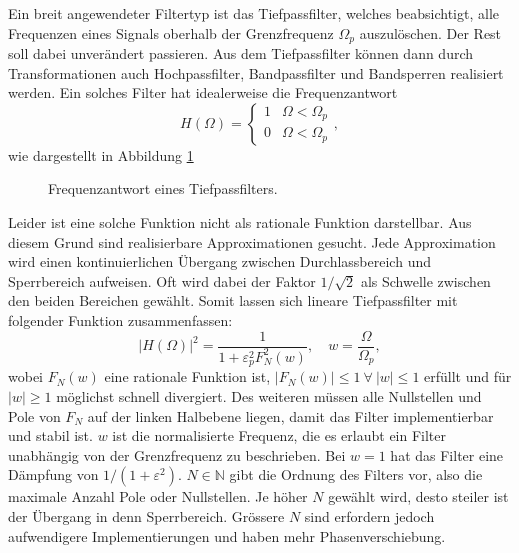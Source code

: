 Ein breit angewendeter Filtertyp ist das Tiefpassfilter, welches beabsichtigt, alle Frequenzen eines Signals oberhalb der Grenzfrequenz $\Omega_p$ auszulöschen.
Der Rest soll dabei unverändert passieren.
Aus dem Tiefpassfilter können dann durch Transformationen auch Hochpassfilter, Bandpassfilter und Bandsperren realisiert werden.
Ein solches Filter hat idealerweise die Frequenzantwort
\begin{equation}
    H(\Omega) =
    \begin{cases}
        1  & \Omega < \Omega_p \\
        0  & \Omega < \Omega_p
    \end{cases},
\end{equation}
wie dargestellt in Abbildung \ref{ellfilter:fig:lp}
\begin{figure}
    \centering
    
    \caption{Frequenzantwort eines Tiefpassfilters.}
    \label{ellfilter:fig:lp}
\end{figure}
Leider ist eine solche Funktion nicht als rationale Funktion darstellbar.
Aus diesem Grund sind realisierbare Approximationen gesucht.
Jede Approximation wird einen kontinuierlichen Übergang zwischen Durchlassbereich und Sperrbereich aufweisen.
Oft wird dabei der Faktor $1/\sqrt{2}$ als Schwelle zwischen den beiden Bereichen gewählt.
Somit lassen sich lineare Tiefpassfilter mit folgender Funktion zusammenfassen:
\begin{equation}
    | H(\Omega)|^2 = \frac{1}{1 + \varepsilon_p^2 F_N^2(w)}, \quad w=\frac{\Omega}{\Omega_p},
\end{equation}
wobei $F_N(w)$ eine rationale Funktion ist, $|F_N(w)| \leq 1 ~\forall~ |w| \leq 1$ erfüllt und für $|w| \geq 1$ möglichst schnell divergiert.
Des weiteren müssen alle Nullstellen und Pole von $F_N$ auf der linken Halbebene liegen, damit das Filter implementierbar und stabil ist.
$w$ ist die normalisierte Frequenz, die es erlaubt ein Filter unabhängig von der Grenzfrequenz zu beschrieben.
Bei $w=1$ hat das Filter eine Dämpfung von $1/(1+\varepsilon^2)$.
$N \in \mathbb{N} $ gibt die Ordnung des Filters vor, also die maximale Anzahl Pole oder Nullstellen.
Je höher $N$ gewählt wird, desto steiler ist der Übergang in denn Sperrbereich.
Grössere $N$ sind erfordern jedoch aufwendigere Implementierungen und haben mehr Phasenverschiebung.

